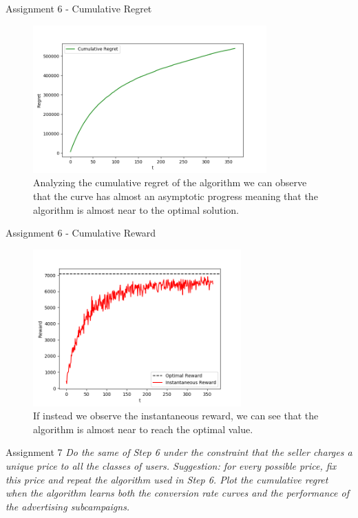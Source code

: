 \documentclass[11pt]{beamer}
\begin{document}
\begin{frame}{Assignment 6 - Cumulative Regret}
\begin{figure}[hbtp]
\centering
\includegraphics[width=0.8\textwidth]{images/assignment_6_cum_regret.png}
\caption{Analyzing the cumulative regret of the algorithm we can observe that the curve has almost an asymptotic progress meaning that the algorithm is almost near to the optimal solution.}
\end{figure}
\end{frame}

\begin{frame}{Assignment 6 - Cumulative Reward}
\begin{figure}[hbtp]
\centering
\includegraphics[width=8cm]{images/assignment_6_inst_reward.png}
\caption{If instead we observe the instantaneous reward, we can see that the algorithm is almost near to reach the optimal value.}
\end{figure}
\end{frame}

\begin{frame}{Assignment 7}
\textit{Do the same of Step 6 under the constraint that the seller charges a unique price to all the classes of users. Suggestion: for every possible price, fix this price and repeat the algorithm used in Step 6. Plot the cumulative regret when the algorithm learns both the conversion rate curves and the performance of the advertising subcampaigns.}
\end{frame}
\end{document}
